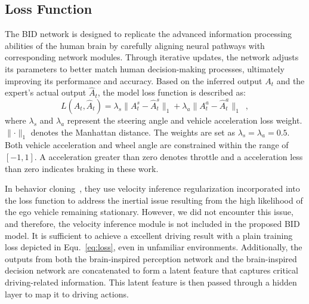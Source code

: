 \documentclass[preprint,12pt]{elsarticle}
\begin{document}
\subsection{Loss Function}

\hspace{1pc}The BID network is designed to replicate the advanced information processing abilities of the human brain by carefully aligning neural pathways with corresponding network modules. 
Through iterative updates, the network adjusts its parameters to better match human decision-making processes, ultimately improving its performance and accuracy.
%
Based on the inferred output $A_t$ and the expert's actual output $\hat{A}_t$, the model loss function is described as:
\begin{equation}\label{eq:loss}
	L(A_t, \hat{A}_t) 
	= \lambda_{s} \lVert A_{t}^s-\hat{A}_t^s \rVert_{1}
	+ \lambda_{a}\lVert A_{t}^a-\hat{A}_{t}^a\rVert_{1} \enspace ,
\end{equation}
where $\lambda_{s}$ and $\lambda_a$ represent the steering angle and vehicle acceleration loss weight.
$\lVert\cdot\rVert_{1}$ denotes the Manhattan distance.
The weights are set as $\lambda_{s} = \lambda_{a} = 0.5$. 
Both vehicle acceleration and wheel angle are constrained within the range of $[-1, 1]$.
A acceleration greater than zero denotes throttle and a acceleration less than zero indicates braking in these work.


In behavior cloning~\cite{Codevilla:2019}, they use velocity inference regularization incorporated into the loss function to address the inertial issue resulting from the high likelihood of the ego vehicle remaining stationary.
However, we did not encounter this issue, and therefore, the velocity inference module is not included in the proposed BID model.
It is sufficient to achieve a excellent driving result with a plain training loss depicted in Equ.~\ref{eq:loss}, even in unfamiliar environments.
%
Additionally, the outputs from both the brain-inspired perception network and the brain-inspired decision network are concatenated to form a latent feature that captures critical driving-related information. 
This latent feature is then passed through a hidden layer to map it to driving actions.


%
\end{document}
